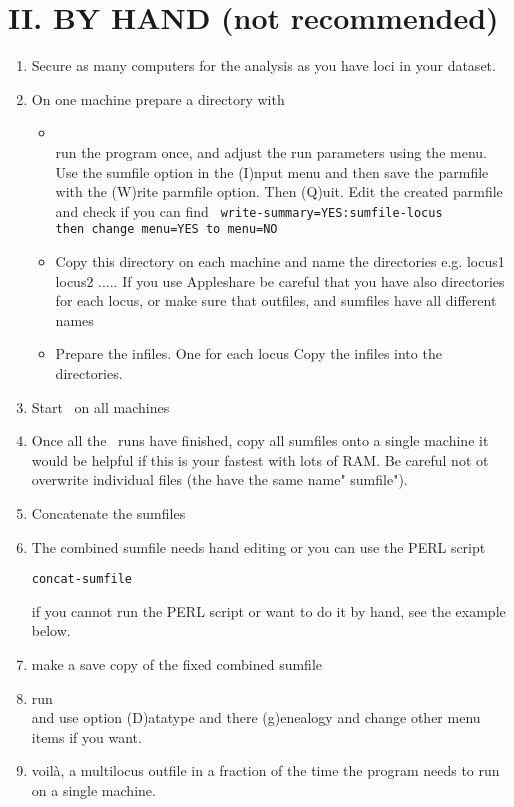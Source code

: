 \section{II. BY HAND (not recommended)} 
\begin{enumerate}
\item Secure as many computers for the analysis as you have loci
    in your dataset.

\item On one machine prepare a directory with
\begin{itemize}
\item \migrate\ \\
    run the program once, and adjust the run parameters using
    the menu. Use the sumfile option in the (I)nput menu
    and then save the parmfile with the 
    (W)rite parmfile option. Then (Q)uit.
    Edit the created parmfile and check if you can find
    \texttt{ 
    write-summary=YES:sumfile-locus\\
    then change menu=YES to menu=NO
}
\item Copy this directory on each machine and name the directories
    e.g. locus1 locus2 .....
    If you use Appleshare be careful that you have also 
    directories for each locus, or make sure that outfiles, and sumfiles
    have all different names
     
\item Prepare the infiles. One for each locus
    Copy the infiles into the directories.
\end{itemize}

\item Start \migrate\ on all machines

\item Once all the \migrate\ runs have finished, 
    copy all sumfiles onto a single machine
    it would be helpful if this is your fastest 
    with lots of RAM. Be careful not ot overwrite
    individual files (the have the same name" sumfile").
 
\item Concatenate the sumfiles 

\item The combined sumfile needs hand editing
    or you can use the PERL script 
    
    \texttt{concat-sumfile}
    
    if you cannot run the PERL script or 
    want to do it by hand, see the example below.

\item make a save copy of the fixed combined sumfile

\item run \migrate\ \\
    and use option (D)atatype and there (g)enealogy
    and change other menu items if you want.
    
\item voil\`a, a multilocus outfile in a fraction of
     the time the program needs to run on a single machine.

\end{enumerate}

